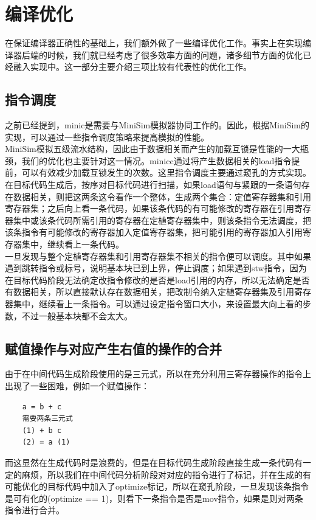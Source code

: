 \documentclass[12pt,a4paper,Flow]{report}
\begin{document}
\chapter{编译优化}
在保证编译器正确性的基础上，我们额外做了一些编译优化工作。事实上在实现编译器后端的时候，我们就已经考虑了很多效率方面的问题，诸多细节方面的优化已经融入实现中。这一部分主要介绍三项比较有代表性的优化工作。
\newpage
\section{指令调度}
之前已经提到，minic是需要与MiniSim模拟器协同工作的。因此，根据MiniSim的实现，可以通过一些指令调度策略来提高模拟的性能。\\
\indent MiniSim模拟五级流水结构，因此由于数据相关而产生的加载互锁是性能的一大瓶颈，我们的优化也主要针对这一情况。minicc通过将产生数据相关的load指令提前，可以有效减少加载互锁发生的次数。这里指令调度主要通过窥孔的方式实现。\\
\indent 在目标代码生成后，按序对目标代码进行扫描，如果load语句与紧跟的一条语句存在数据相关，则把这两条这令看作一个整体，生成两个集合：定值寄存器集和引用寄存器集；之后向上看一条代码，如果该条代码的有可能修改的寄存器在引用寄存器集中或该条代码所需引用的寄存器在定植寄存器集中，则该条指令无法调度，把该条指令有可能修改的寄存器加入定值寄存器集，把可能引用的寄存器加入引用寄存器集中，继续看上一条代码。\\
\indent	一旦发现与整个定植寄存器集和引用寄存器集不相关的指令便可以调度。其中如果遇到跳转指令或标号，说明基本块已到上界，停止调度；如果遇到stw指令，因为在目标代码阶段无法确定改指令修改的是否是load引用的内存，所以无法确定是否有数据相关，所以直接默认存在数据相关，把改制令纳入定植寄存器集及引用寄存器集中，继续看上一条指令。可以通过设定指令窗口大小，来设置最大向上看的步数，不过一般基本块都不会太大。
\section{赋值操作与对应产生右值的操作的合并}
由于在中间代码生成阶段使用的是三元式，所以在充分利用三寄存器操作的指令上出现了一些困难，例如一个赋值操作：
\begin{verbatim}
	a = b + c
	需要两条三元式
	(1) + b c
	(2) = a (1)
\end{verbatim}
而这显然在生成代码时是浪费的，但是在目标代码生成阶段直接生成一条代码有一定的麻烦，所以我们在中间代码分析阶段对对应的指令进行了标记，并在生成的有可能优化的目标代码中加入了optimize标记，所以在窥孔阶段，一旦发现该条指令是可有化的(optimize == 1)，则看下一条指令是否是mov指令，如果是则对两条指令进行合并。
\end{document}
